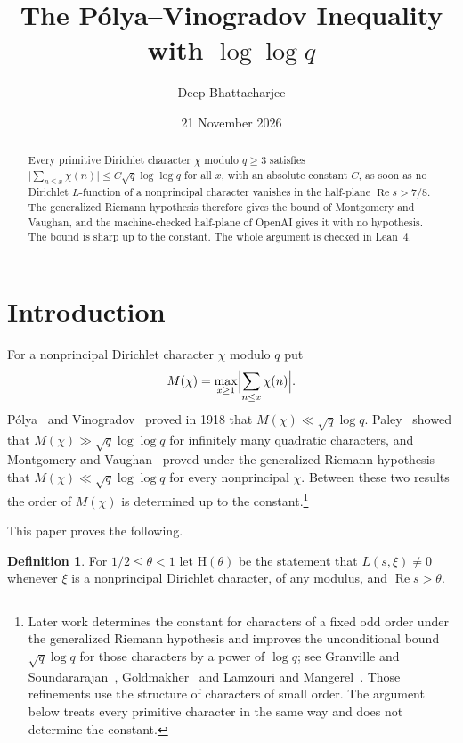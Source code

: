 \documentclass[11pt]{amsart}
\title{The P\'olya--Vinogradov Inequality with $\log\log q$}
\author{Deep Bhattacharjee}
\date{21 November 2026}
\theoremstyle{definition}
\newtheorem{definition}[theorem]{Definition}
\theoremstyle{remark}
\numberwithin{equation}{section}
\newcommand{\R}{\operatorname{Re}}
\begin{document}
\sloppy
\begin{abstract}
Every primitive Dirichlet character $\chi$ modulo $q\ge3$ satisfies
$\bigl|\sum_{n\le x}\chi(n)\bigr|\le C\sqrt q\log\log q$ for all $x$, with an
absolute constant $C$, as soon as no Dirichlet $L$-function of a nonprincipal
character vanishes in the half-plane $\R s>7/8$. The generalized Riemann
hypothesis therefore gives the bound of Montgomery and Vaughan, and the
machine-checked half-plane of OpenAI gives it with no hypothesis. The bound
is sharp up to the constant. The whole argument is checked in Lean~4.
\end{abstract}
\maketitle

\section{Introduction}

For a nonprincipal Dirichlet character $\chi$ modulo $q$ put
\[
M(\chi)=\max_{x\ge1}\Bigl|\sum_{n\le x}\chi(n)\Bigr| .
\]
P\'olya~\cite{polya18} and Vinogradov~\cite{vinogradov18} proved in 1918 that
$M(\chi)\ll\sqrt q\log q$. Paley~\cite{paley32} showed that $M(\chi)\gg\sqrt
q\log\log q$ for infinitely many quadratic characters, and Montgomery and
Vaughan~\cite{mv77} proved under the generalized Riemann hypothesis that
$M(\chi)\ll\sqrt q\log\log q$ for every nonprincipal $\chi$. Between these two
results the order of $M(\chi)$ is determined up to the constant.\footnote{Later
work determines the constant for characters of a fixed odd order under the
generalized Riemann hypothesis and improves the unconditional bound
$\sqrt q\log q$ for those characters by a power of $\log q$; see Granville and
Soundararajan~\cite{gs07}, Goldmakher~\cite{goldmakher12} and Lamzouri and
Mangerel~\cite{lm22}. Those refinements use the structure of characters of
small order. The argument below treats every primitive character in the same
way and does not determine the constant.}

This paper proves the following.

\begin{definition}\label{def:H}
For $1/2\le\theta<1$ let $\mathrm H(\theta)$ be the statement that
$L(s,\xi)\ne0$ whenever $\xi$ is a nonprincipal Dirichlet character, of any
modulus, and $\R s>\theta$.
\end{definition}
\end{document}
